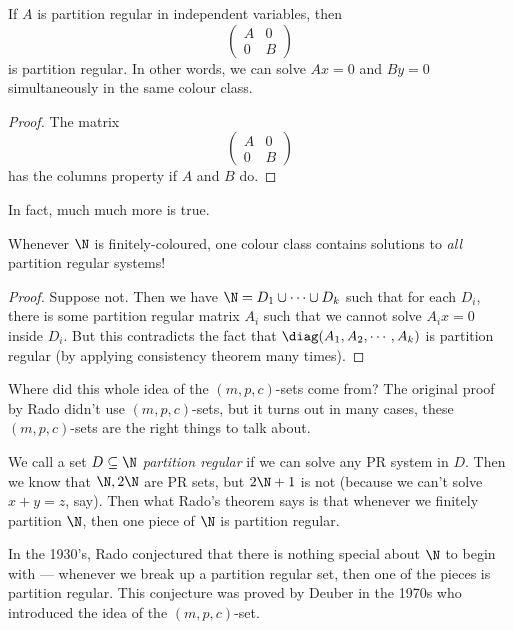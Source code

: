 \documentclass[a4paper]{article}
\begin{document}
\begin{cor}
  If $A$ is partition regular in independent variables, then
  \[
    \begin{pmatrix}
      A & 0\\
      0 & B
    \end{pmatrix}
  \]
  is partition regular. In other words, we can solve $Ax = 0$ and $By = 0$ simultaneously in the same colour class.
\end{cor}

\begin{proof}
  The matrix
  \[
    \begin{pmatrix}
      A & 0\\
      0 & B
    \end{pmatrix}
   \]
   has the columns property if $A$ and $B$ do.
\end{proof}
In fact, much much more is true.

\begin{cor}
  Whenever $\N$ is finitely-coloured, one colour class contains solutions to \emph{all} partition regular systems!
\end{cor}

\begin{proof}
  Suppose not. Then we have $\N = D_1 \cup \cdots \cup D_k$ such that for each $D_i$, there is some partition regular matrix $A_i$ such that we cannot solve $A_i x = 0$ inside $D_i$. But this contradicts the fact that $\diag(A_1, A_2, \cdots, A_k)$ is partition regular (by applying consistency theorem many times).
\end{proof}

Where did this whole idea of the $(m, p, c)$-sets come from? The original proof by Rado didn't use $(m, p, c)$-sets, but it turns out in many cases, these $(m, p, c)$-sets are the right things to talk about.

We call a set $D \subseteq \N$ \emph{partition regular} if we can solve any PR system in $D$. Then we know that $\N, 2\N$ are PR sets, but $2\N + 1$ is not (because we can't solve $x + y = z$, say). Then what Rado's theorem says is that whenever we finitely partition $\N$, then one piece of $\N$ is partition regular.

In the 1930's, Rado conjectured that there is nothing special about $\N$ to begin with --- whenever we break up a partition regular set, then one of the pieces is partition regular. This conjecture was proved by Deuber in the 1970s who introduced the idea of the $(m, p, c)$-set.
\end{document}
